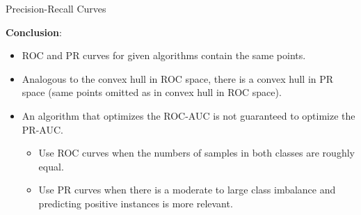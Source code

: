 \documentclass[11pt,compress,t,notes=noshow, xcolor=table]{beamer}
\begin{document}
\begin{vbframe}{Precision-Recall Curves}
\framebreak

\textbf{Conclusion}: \\

\begin{itemize}
  \item ROC and PR curves for given algorithms contain the same points.
  \item Analogous to the convex hull in ROC space, there is a convex hull in PR 
  space (same points omitted as in convex hull in ROC space).
  \item An algorithm that optimizes the ROC-AUC is not guaranteed to optimize
  the PR-AUC.
  \begin{itemize}
    \item Use ROC curves when the numbers of samples in both classes are 
    roughly equal.
    \item Use PR curves when there is a moderate to large class
    imbalance and predicting positive instances is more relevant.
  \end{itemize}
\end{itemize}
\end{vbframe}

\end{document}
